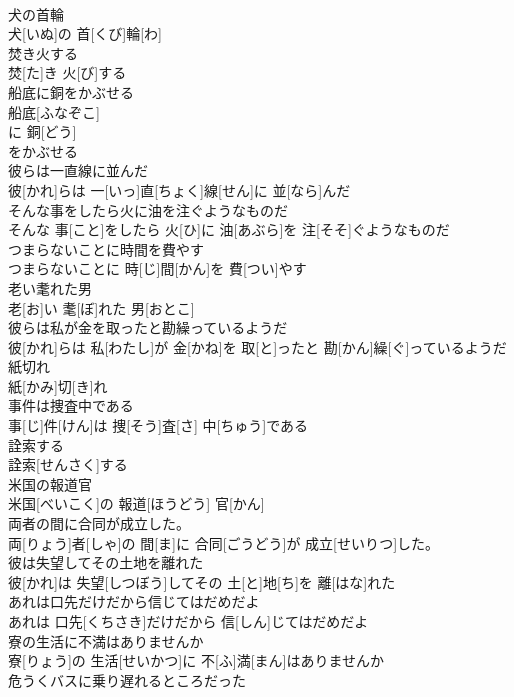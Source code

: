 \documentclass[8pt]{extreport}
\begin{document}
\begin{CJK}{UTF8}{min}
\\	犬の首輪	
\\	犬[いぬ]の 首[くび]輪[わ]
\\	焚き火する	
\\	焚[た]き 火[び]する
\\	船底に銅をかぶせる	
\\	船底[ふなぞこ] 
\\	に 銅[どう] 
\\	をかぶせる 
\\	彼らは一直線に並んだ	
\\	彼[かれ]らは 一[いっ]直[ちょく]線[せん]に 並[なら]んだ
\\	そんな事をしたら火に油を注ぐようなものだ	
\\	そんな 事[こと]をしたら 火[ひ]に 油[あぶら]を 注[そそ]ぐようなものだ
\\	つまらないことに時間を費やす	
\\	つまらないことに 時[じ]間[かん]を 費[つい]やす
\\	老い耄れた男	
\\	老[お]い 耄[ぼ]れた 男[おとこ]
\\	彼らは私が金を取ったと勘繰っているようだ	
\\	彼[かれ]らは 私[わたし]が 金[かね]を 取[と]ったと 勘[かん]繰[ぐ]っているようだ
\\	紙切れ	
\\	紙[かみ]切[き]れ
\\	事件は捜査中である	
\\	事[じ]件[けん]は 捜[そう]査[さ] 中[ちゅう]である
\\	詮索する	
\\	詮索[せんさく]する
\\	米国の報道官	
\\	米国[べいこく]の 報道[ほうどう] 官[かん]
\\	両者の間に合同が成立した。	
\\	両[りょう]者[しゃ]の 間[ま]に 合同[ごうどう]が 成立[せいりつ]した。
\\	彼は失望してその土地を離れた	
\\	彼[かれ]は 失望[しつぼう]してその 土[と]地[ち]を 離[はな]れた
\\	あれは口先だけだから信じてはだめだよ	
\\	あれは 口先[くちさき]だけだから 信[しん]じてはだめだよ
\\	寮の生活に不満はありませんか	
\\	寮[りょう]の 生活[せいかつ]に 不[ふ]満[まん]はありませんか
\\	危うくバスに乗り遅れるところだった	

\end{CJK}
\end{document}
